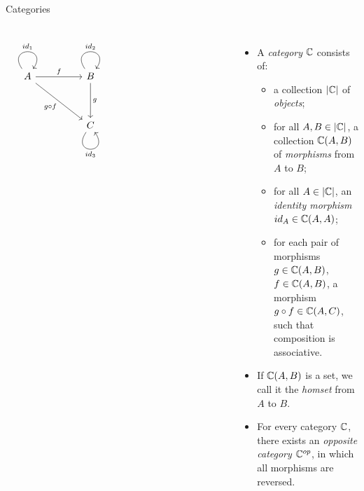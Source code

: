 \begin{frame}[fragile]{Categories}
\begin{columns}
\[\begin{tikzcd}
	A && B \\
	\\
	&& C &&&&& {}
	\arrow["{id_1}", from=1-1, to=1-1, loop, in=55, out=125, distance=10mm]
	\arrow["f", from=1-1, to=1-3]
	\arrow["{g \circ f}"', from=1-1, to=3-3]
	\arrow["{id_2}", from=1-3, to=1-3, loop, in=55, out=125, distance=10mm]
	\arrow["g", from=1-3, to=3-3]
	\arrow["{id_3}"', from=3-3, to=3-3, loop, in=305, out=235, distance=10mm]
\end{tikzcd}\]
\begin{itemize}
 \item
A \textit{category} $\mathbb{C}$ consists of:
\begin{itemize}
 \pause\item a collection $|\mathbb{C}|$ of \textit{objects};
 \pause\item for all $A, B \in |\mathbb{C}|$, a collection $\mathbb{C}(A, B)$ of \textit{morphisms} from $A$ to $B$;
 \pause\item for all $A \in |\mathbb{C}|$, an \textit{identity morphism} $id_A \in \mathbb{C}(A, A)$;
 \pause\item for each pair of morphisms $g \in \mathbb{C}(A,B)$, $f \in \mathbb{C}(A,B)$, a morphism $g \circ f \in \mathbb{C}(A,C)$, such that composition is associative.
\end{itemize}
\pause\item If $\mathbb{C}(A, B)$ is a set, we call it the \textit{homset} from $A$ to $B$.
\pause\item For every category $\mathbb{C}$, there exists an \textit{opposite category} $\mathbb{C}^{op}$, in which all morphisms are reversed.
\end{itemize}
\end{columns}
\end{frame}
